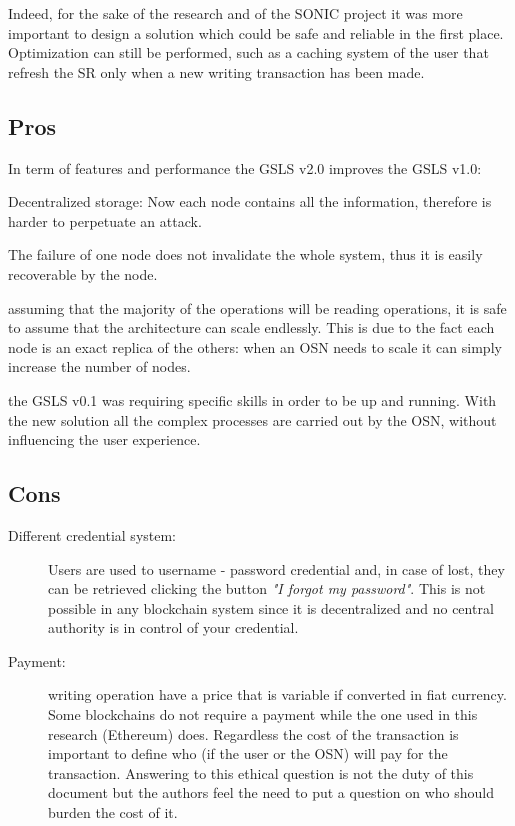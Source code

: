 Indeed, for the sake of the research and of the SONIC project it was more important to design a solution which could be safe and reliable in the first place. Optimization can still be performed, such as a caching system of the user that refresh the SR only when a new writing transaction has been made.






\subsection{Pros}

In term of features and performance the GSLS v2.0 improves the GSLS v1.0:

\begin{description}
    \item{Decentralized storage:} Now each node contains all the information, therefore is harder to perpetuate an attack.
    \item[Fault tolerant:] The failure of one node does not invalidate the whole system, thus it is easily recoverable by the node.
    \item[Endless scalability:] assuming that the majority of the operations will be reading operations, it is safe to assume that the architecture can scale endlessly. This is due to the fact each node is an exact replica of the others: when an OSN needs to scale it can simply increase the number of nodes.
    \item[No overhead for the users:] the GSLS v0.1 was requiring specific skills in order to be up and running. With the new solution all the complex processes are carried out by the OSN, without influencing the user experience.
\end{description}


\subsection{Cons}

\begin{description}
    \item[Different credential system:] Users are used to username - password credential and, in case of lost, they can be retrieved clicking the button \textit{"I forgot my password"}. This is not possible in any blockchain system since it is decentralized and no central authority is in control of your credential.
    \item[Payment:] writing operation have a price that is variable if converted in fiat currency. Some blockchains do not require a payment while the one used in this research (Ethereum) does. Regardless the cost of the transaction is important to define who (if the user or the OSN) will pay for the transaction. Answering to this ethical question is not the duty of this document but the authors feel the need to put a question on who should burden the cost of it.
\end{description}


